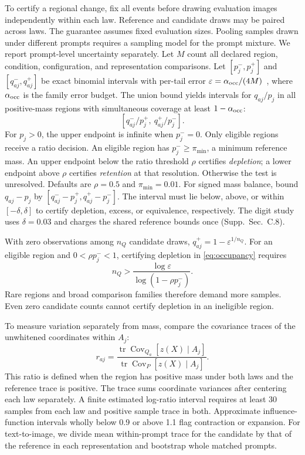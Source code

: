 To certify a regional change, fix all events before drawing evaluation
images independently within each law. Reference and candidate draws may
be paired across laws. The guarantee assumes fixed evaluation sizes.
Pooling samples drawn under different prompts requires a sampling model
for the prompt mixture. We report prompt-level uncertainty separately.
Let $M$ count all declared region, condition, configuration, and
representation comparisons. Let $[p_j^-,p_j^+]$ and $[q_{aj}^-,q_{aj}^+]$
be exact binomial intervals with per-tail error
$\varepsilon=\alpha_{\rm occ}/(4M)$~\cite{clopper1934confidence}, where
$\alpha_{\rm occ}$ is the family error budget. The union bound yields
intervals for $q_{aj}/p_j$ in all positive-mass regions with simultaneous coverage at least
$1-\alpha_{\rm occ}$:
\begin{equation}
\left[q_{aj}^-/p_j^+,\ q_{aj}^+/p_j^-\right].
\label{eq:occupancy}
\end{equation}
For $p_j>0$, the upper endpoint is infinite when $p_j^-=0$.
Only eligible regions receive a ratio decision. An eligible region has
$p_j^-\geq\pi_{\min}$, a minimum reference mass. An upper endpoint below
the ratio threshold $\rho$ certifies \emph{depletion}; a lower endpoint
above $\rho$ certifies \emph{retention} at that resolution. Otherwise the
test is unresolved. Defaults are $\rho=0.5$ and $\pi_{\min}=0.01$.
For signed mass balance, bound $q_{aj}-p_j$ by
$[q_{aj}^--p_j^+,q_{aj}^+-p_j^-]$. The interval must lie below, above,
or within $[-\delta,\delta]$ to certify depletion, excess, or equivalence,
respectively. The digit study uses $\delta=0.03$ and charges the shared
reference bounds once (Supp.~Sec.~C.8).

With zero observations among $n_Q$ candidate draws,
$q_{aj}^+=1-\varepsilon^{1/n_Q}$. For an eligible region and
$0<\rho p_j^-<1$, certifying depletion in \cref{eq:occupancy} requires
\begin{equation}
n_Q>\frac{\log\varepsilon}{\log(1-\rho p_j^-)}.
\label{eq:planning}
\end{equation}
Rare regions and broad comparison families therefore demand more samples.
Even zero candidate counts cannot certify depletion in an ineligible region.

To measure variation separately from mass, compare the covariance traces
of the unwhitened coordinates within $A_j$:
\begin{equation}
r_{aj}=\frac{\operatorname{tr}\operatorname{Cov}_{Q_a}[z(X)\mid A_j]}
{\operatorname{tr}\operatorname{Cov}_{P}[z(X)\mid A_j]}.
\label{eq:spread}
\end{equation}
This ratio is defined when the region has positive mass under both laws
and the reference trace is positive. The trace sums coordinate variances
after centering each law separately.
A finite estimated log-ratio interval requires at least 30 samples from
each law and positive sample trace in both. Approximate influence-function intervals
wholly below 0.9 or above 1.1 flag contraction or expansion. For text-to-image,
we divide mean within-prompt trace for the candidate by that of the reference
in each representation and bootstrap whole matched prompts.

